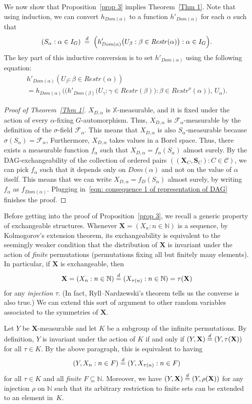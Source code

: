 \documentclass[AHL,Unicode,longabstracts,published]{cedram}
\newcommand{\alf}{\alpha}%
\newcommand*\bb{\beta}
\renewcommand{\d}{\buildrel{d}\over{=}}
\newcommand*\rstr{\mathit{Restr}}
\newcommand*\srstr{\mathit{Restr}^o}
\newcommand*\dom{\mathit{Dom}}
\newcommand*\X{\mathbb{X}}
\newcommand*\N{\mathbb{N}}
\newcommand*\CC{{\mathcal{C}}}
\newcommand*\FF{\mathcal{F}}
\newcommand*\bS{\mathbf{S}}
\newcommand*\bX{\mathbf{X}}
\newcommand*\N{\mathbb{N}}
\begin{document}
We now show that Proposition~\ref{prop 3} implies Theorem~\ref{Thm 1}. Note that using induction, we can convert $h_{\dom(\alf)}$ to a function $h'_{\dom(\alf)}$ for each $\alf$ such that
\begin{equation}\label{eqn: consequence 1 of representation of DAG}
(S_\alf : \alf \in I_G) \;\d\; \Big(h'_{\dom(\alf)}\big(U_\bb : \bb\in \rstr(\alf)\big) : \alf \in I_G\Big).
\end{equation}
The key part of this inductive conversion is to set $h'_{\dom(\alf)}$ using the following equation:
\begin{multline*}
h'_{\dom(\alf)}(U_\bb : \bb \in \rstr(\alf)) \\
= h_{\dom(\alf)}\Bigg(\Big(h'_{\dom(\bb)}\big(U_{\gamma} : \gamma \in \rstr(\bb)\big) : \bb \in \srstr(\alf)\Big),\, U_\alf \Bigg).
\end{multline*}
\begin{proof}[Proof of Theorem~\ref{Thm 1}] $X_{D,\alf}$ is $\X$-measurable, and it is fixed under the action of every $\alf$-fixing $G$-automorphism. Thus, $X_{D,\alf}$ is $\FF_\alf$-measurable by the definition of the $\sigma$-field $\FF_\alf$. This means that $X_{D,\alf}$ is also $S_\alf$-measurable because $\sigma(S_\alf) = \FF_\alf$,
Furthermore, $X_{D,\alf}$ takes values in a Borel space. Thus, there exists a measurable function $f_\alf$ such that $X_{D,\alf} = f_\alf(S_\alf)$ almost surely. By the DAG-exchangeability of the collection of ordered pairs $((\bX_C,\bS_C) : C \in \CC)$, we can pick $f_\alf$ such that it depends only on $\dom(\alf)$ and not on the value of $\alf$ itself. This means that we can write $X_{D,\alf} = f_{D}(S_\alf)$ almost surely, by writing $f_\alpha$ as $f_{\dom(\alf)}$. Plugging in~\eqref{eqn: consequence 1 of representation of DAG} finishes the proof.
\end{proof}

\begin{remark}
Before getting into the proof of Proposition~\ref{prop 3}, we recall a generic property of exchangeable structures. Whenever $\bX =(X_n : n \in \N)$ is a sequence, by Kolmogorov's extension theorem, its exchangeability is equivalent to the seemingly weaker condition that the distribution of $\bX$ is invariant under the action of \emph{finite} permutations (permutations fixing all but finitely many elements). In particular, if $\bX$ is exchangeable, then
\[
\bX = (X_n : n \in \N) \d (X_{\tau(n)} : n \in \N) = \tau(\bX)
\]
for any \emph{injection} $\tau$. (In fact, Ryll--Nardzewski's theorem tells us the converse is also true.) We can extend this sort of argument to other random variables associated to the symmetries of $\bX$.

Let $Y$ be $\bX$-measurable and let $K$ be a subgroup of the infinite permutations. By definition, $Y$ is invariant under the action of $K$ if and only if $(Y, \bX) \d (Y, \tau(\bX))$ for all $\tau \in K$. By the above paragraph, this is equivalent to having
\[
(Y, X_n : n \in F) \d (Y, X_{\tau(n)}: n \in F)
\]
for all $\tau \in K$ and all \emph{finite} $F \subseteq \N$. Moreover, we have $(Y,\bX)\d(Y,\rho(\bX))$ for any injection $\rho$ on $\N$ such that its arbitrary restriction to finite sets can be extended to an element in~$K$.
\end{remark}
\end{document}
